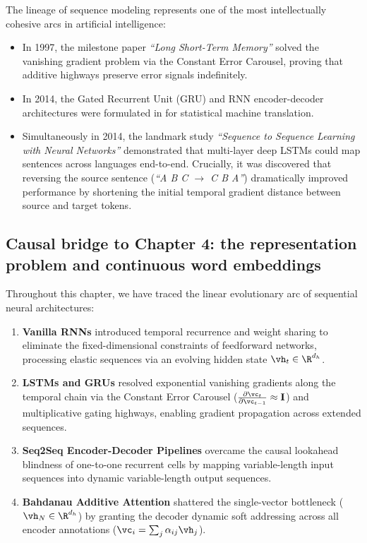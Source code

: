 \documentclass[../../main.tex]{subfiles}
\begin{document}
\begin{deepdive}
The lineage of sequence modeling represents one of the most intellectually cohesive arcs in artificial intelligence:
\begin{itemize}
    \item In 1997, the milestone paper \textit{``Long Short-Term Memory''} \cite{hochreiter1997} solved the vanishing gradient problem via the Constant Error Carousel, proving that additive highways preserve error signals indefinitely.
    \item In 2014, the Gated Recurrent Unit (GRU) and RNN encoder-decoder architectures were formulated in \cite{cho2014} for statistical machine translation.
    \item Simultaneously in 2014, the landmark study \textit{``Sequence to Sequence Learning with Neural Networks''} \cite{sutskever2014} demonstrated that multi-layer deep LSTMs could map sentences across languages end-to-end. Crucially, it was discovered that reversing the source sentence (\textit{``A B C $\to$ C B A''}) dramatically improved performance by shortening the initial temporal gradient distance between source and target tokens.
\end{itemize}
\end{deepdive}

\subsection{Causal bridge to Chapter 4: the representation problem and continuous word embeddings}
\label{subsec:bridge_to_chapter_4}

Throughout this chapter, we have traced the linear evolutionary arc of sequential neural architectures:
\begin{enumerate}
    \item \textbf{Vanilla RNNs} introduced temporal recurrence and weight sharing to eliminate the fixed-dimensional constraints of feedforward networks, processing elastic sequences via an evolving hidden state $\vh_t \in \R^{d_h}$.
    \item \textbf{LSTMs and GRUs} resolved exponential vanishing gradients along the temporal chain via the Constant Error Carousel ($\frac{\partial \vc_t}{\partial \vc_{t-1}} \approx \mathbf{I}$) and multiplicative gating highways, enabling gradient propagation across extended sequences.
    \item \textbf{Seq2Seq Encoder-Decoder Pipelines} overcame the causal lookahead blindness of one-to-one recurrent cells by mapping variable-length input sequences into dynamic variable-length output sequences.
    \item \textbf{Bahdanau Additive Attention} shattered the single-vector bottleneck ($\vh_N \in \R^{d_h}$) by granting the decoder dynamic soft addressing across all encoder annotations ($\vc_i = \sum_j \alpha_{ij} \vh_j$).
\end{enumerate}
\end{document}
